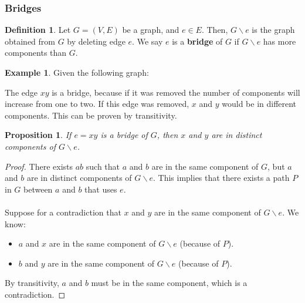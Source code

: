 \documentclass[]{article}
\newtheorem*{proposition}{Proposition}
\theoremstyle{definition}
\newtheorem*{defn}{Definition}
\newtheorem{ex}{Example}[section]
\newcommand{\lecture}[1]{\marginpar{{\footnotesize $\leftarrow$ \underline{#1}}}}
\begin{document}
			\subsubsection{Bridges}
				\begin{defn}
					Let $G = (V, E)$ be a graph, and $e \in E$. Then, $G \backslash e$ is the graph obtained from $G$ by deleting edge $e$. We say $e$ is a \textbf{bridge} of $G$ if $G \backslash e$ has more components than $G$.
				\end{defn}

				\begin{ex}
					Given the following graph:
					\begin{center}
					\end{center}

					The edge $xy$ is a bridge, because if it was removed the number of components will increase from one to two. If this edge was removed, $x$ and $y$ would be in different components. This can be proven by transitivity.
				\end{ex}

				
				\begin{proposition} \lecture{March 6, 2013}
					If $e = xy$ is a bridge of $G$, then $x$ and $y$ are in distinct components of $G \backslash e$.
				\end{proposition}

				\begin{proof}
					There exists $ab$ such that $a$ and $b$ are in the same component of $G$, but $a$ and $b$ are in distinct components of $G \backslash e$. This implies that there exists a path $P$ in $G$ between $a$ and $b$ that uses $e$.
					\\ \\
					Suppose for a contradiction that $x$ and $y$ are in the same component of $G \backslash e$. We know:
					\begin{itemize}
						\item $a$ and $x$ are in the same component of $G \backslash e$ (because of $P$).
						\item $b$ and $y$ are in the same component of $G \backslash e$ (because of $P$).
					\end{itemize}

					By transitivity, $a$ and $b$ must be in the same component, which is a contradiction.
				\end{proof}
\end{document}
